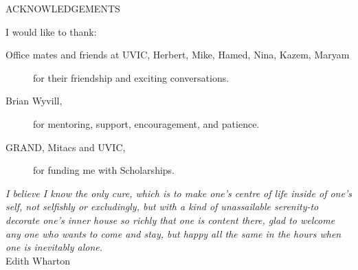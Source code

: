 \newpage
{}

\begin{center}
ACKNOWLEDGEMENTS
\end{center}

\noindent I would like to thank:
\begin{description}
\item[Office mates and friends at UVIC, Herbert, Mike, Hamed, Nina, Kazem, Maryam]
	for their friendship and exciting conversations.
\item[Brian Wyvill,]
	for  mentoring, support, encouragement, and patience.
\item[GRAND, Mitacs and UVIC,]
	for funding me with Scholarships.
\end{description}

\begin{flushright}
\textit{I believe I know the only cure, which is to make
one's centre of life inside of one's self, not
selfishly or excludingly, but with a kind of
unassailable serenity-to decorate one's inner house
so richly that one is content there, glad to welcome
any one who wants to come and stay, but happy all
the same in the hours when one is inevitably alone.}
\\
Edith Wharton \\
\end{flushright}

